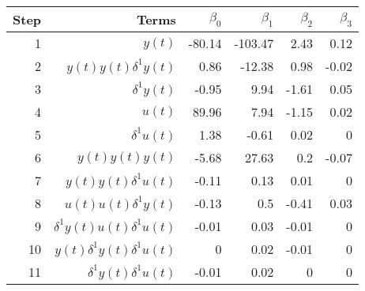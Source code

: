 \begin{tabular}{rrrrrr}
Step & Terms & $\beta_{0}$ & $\beta_{1}$ & $\beta_{2}$ & $\beta_{3}$ \\ 
\hline 
1 & $y(t)$ & -80.14 & -103.47 & 2.43 & 0.12 \\ 
2 & $y(t)y(t)\delta^1 y(t)$ & 0.86 & -12.38 & 0.98 & -0.02 \\ 
3 & $\delta^1 y(t)$ & -0.95 & 9.94 & -1.61 & 0.05 \\ 
4 & $u(t)$ & 89.96 & 7.94 & -1.15 & 0.02 \\ 
5 & $\delta^1 u(t)$ & 1.38 & -0.61 & 0.02 & 0 \\ 
6 & $y(t)y(t)y(t)$ & -5.68 & 27.63 & 0.2 & -0.07 \\ 
7 & $y(t)y(t)\delta^1 u(t)$ & -0.11 & 0.13 & 0.01 & 0 \\ 
8 & $u(t)u(t)\delta^1 y(t)$ & -0.13 & 0.5 & -0.41 & 0.03 \\ 
9 & $\delta^1 y(t)u(t)\delta^1 u(t)$ & -0.01 & 0.03 & -0.01 & 0 \\ 
10 & $y(t)\delta^1 y(t)\delta^1 u(t)$ & 0 & 0.02 & -0.01 & 0 \\ 
11 & $\delta^1 y(t)\delta^1 u(t)$ & -0.01 & 0.02 & 0 & 0 \\ 
\hline 
\end{tabular}